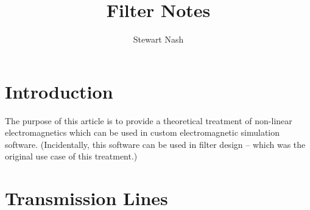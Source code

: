 \documentclass{article}
\begin{document}
	\title{Filter Notes}
	\author{Stewart Nash}

	\maketitle
	
	\section{Introduction}
The purpose of this article is to provide a theoretical treatment of non-linear electromagnetics which can be used in custom electromagnetic simulation software. (Incidentally, this software can be used in filter design -- which was the original use case of this treatment.)
	
	\section{Transmission Lines}
\end{document}

